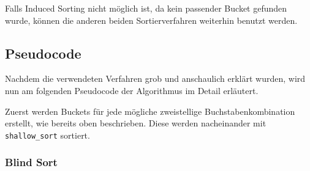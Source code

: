 Falls Induced Sorting nicht möglich ist, da kein passender Bucket gefunden wurde, können die anderen beiden Sortierverfahren weiterhin benutzt werden.

\subsection{Pseudocode}
Nachdem die verwendeten Verfahren grob und anschaulich erklärt wurden, wird nun am folgenden Pseudocode der Algorithmus im Detail erläutert.

Zuerst werden Buckets für jede mögliche zweistellige Buchstabenkombination erstellt, wie bereits oben beschrieben.
Diese werden nacheinander mit \texttt{shallow\_sort} sortiert.

\subsubsection{Blind Sort}
